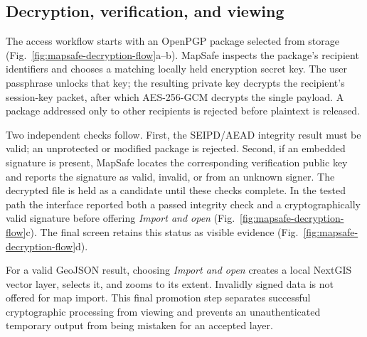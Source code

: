 \subsection{Decryption, verification, and viewing}
\label{subsec:mapsafe-decryption-results}

The access workflow starts with an OpenPGP package selected from storage
(Fig.~\ref{fig:mapsafe-decryption-flow}a--b).  MapSafe inspects the package's
recipient identifiers and chooses a matching locally held encryption secret
key.  The user passphrase unlocks that key; the resulting private key decrypts
the recipient's session-key packet, after which AES-256-GCM decrypts the single
payload.  A package addressed only to other recipients is rejected before
plaintext is released.

Two independent checks follow.  First, the SEIPD/AEAD integrity result must be
valid; an unprotected or modified package is rejected.  Second, if an embedded
signature is present, MapSafe locates the corresponding verification public key
and reports the signature as valid, invalid, or from an unknown signer.  The
decrypted file is held as a candidate until these checks complete.  In the
tested path the interface reported both a passed integrity check and a
cryptographically valid signature before offering \emph{Import and open}
(Fig.~\ref{fig:mapsafe-decryption-flow}c).  The final screen retains this status
as visible evidence (Fig.~\ref{fig:mapsafe-decryption-flow}d).

For a valid GeoJSON result, choosing \emph{Import and open} creates a local
NextGIS vector layer, selects it, and zooms to its extent.  Invalidly signed data
is not offered for map import.  This final promotion step separates successful
cryptographic processing from viewing and prevents an unauthenticated temporary
output from being mistaken for an accepted layer.

